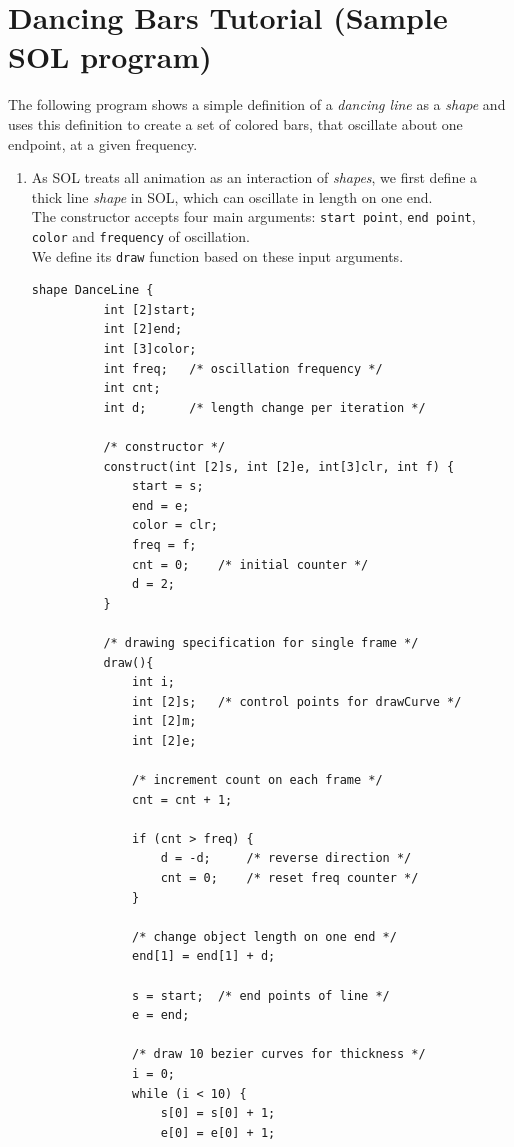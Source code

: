 \documentclass[letterpaper,12pt]{report}
\begin{document}
  \section{Dancing Bars Tutorial (Sample SOL program)}
  The following program shows a simple definition of a \textit{dancing line} as a \textit{shape} and uses this definition to create a set of colored bars, that oscillate about one endpoint, at a given frequency.
  \begin{enumerate}
    \itemsep 0em
    \item As SOL treats all animation as an interaction of \textit{shapes}, we first define a thick line \textit{shape} in SOL, which can oscillate in length on one end.\\
    The constructor accepts four main arguments: \texttt{start point}, \texttt{end point}, \texttt{color} and \texttt{frequency} of oscillation.\\
    We define its \texttt{draw} function based on these input arguments.\\

    \begin{lstlisting}[style=sol, aboveskip=1pt]
      shape DanceLine {
          int [2]start;
          int [2]end;
          int [3]color;
          int freq;   /* oscillation frequency */
          int cnt;
          int d;      /* length change per iteration */

          /* constructor */
          construct(int [2]s, int [2]e, int[3]clr, int f) {
              start = s;
              end = e;
              color = clr; 
              freq = f;   
              cnt = 0;    /* initial counter */
              d = 2;  
          }

          /* drawing specification for single frame */
          draw(){
              int i;
              int [2]s;   /* control points for drawCurve */
              int [2]m;
              int [2]e;

              /* increment count on each frame */
              cnt = cnt + 1;

              if (cnt > freq) {
                  d = -d;     /* reverse direction */
                  cnt = 0;    /* reset freq counter */
              }

              /* change object length on one end */
              end[1] = end[1] + d;

              s = start;  /* end points of line */
              e = end;

              /* draw 10 bezier curves for thickness */
              i = 0;
              while (i < 10) {
                  s[0] = s[0] + 1;
                  e[0] = e[0] + 1;


\end{lstlisting}
\end{enumerate}
\end{document}
